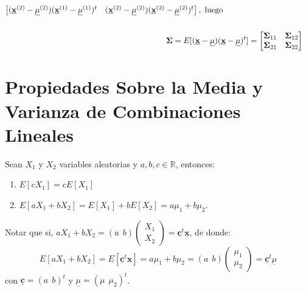 \documentclass[
]{book}
\theoremstyle{definition}
\theoremstyle{definition}
\theoremstyle{definition}
\theoremstyle{definition}
\theoremstyle{remark}
\begin{document}
\begin{align*}
\begin{bmatrix}
( \underline{\mathbf{x}}^{(2)}-\underline{\mu}^{(2)} )
( \underline{\mathbf{x}}^{(1)}-\underline{\mu}^{(1)} )^t &
  ( \underline{\mathbf{x}}^{(2)}-\underline{\mu}^{(2)} )
( \underline{\mathbf{x}}^{(2)}-\underline{\mu}^{(2)} )^t
\end{bmatrix}, \ \text{luego}
\\ \\
&\hspace{-2.5cm}
\mathbf{\Sigma} = E[(\underline{\mathbf{x}}-\underline{\mu})(\underline{\mathbf{x}}-\underline{\mu})^t]=\begin{bmatrix}
\mathbf{\Sigma}_{11} & \mathbf{\Sigma}_{12}\\
\mathbf{\Sigma}_{21} & \mathbf{\Sigma}_{22}
\end{bmatrix}
\end{align*}

\hypertarget{propiedades-sobre-la-media-y-varianza-de-combinaciones-lineales}{%
\section{Propiedades Sobre la Media y Varianza de Combinaciones Lineales}\label{propiedades-sobre-la-media-y-varianza-de-combinaciones-lineales}}

Sean \(X_1\) y \(X_2\) variables aleatorias y \(a,b,c \in \mathbb{R}\), entonces:

\begin{enumerate}
\def\labelenumi{\arabic{enumi}.}
\item
  \(E[cX_1]=cE[X_1]\)
\item
  \(E[aX_1+bX_2]=E[X_1]+bE[X_2]=a\mu_1+b\mu_2\).
\end{enumerate}

Notar que si, \(aX_1+bX_2=(a \ \ b)\begin{pmatrix} X_1 \\ X_2 \end{pmatrix}=\underline{\mathbf{c}}^t\underline{\mathbf{x}}\), de donde:
\[
E[aX_1+bX_2]=E[\underline{\mathbf{c}}^t\underline{\mathbf{x}}]=a\mu_1+b\mu_2=(a \ \ b)\begin{pmatrix}
\mu_1 \\ \mu_2
\end{pmatrix}=\underline{\mathbf{c}}^t \underline{\mu}
\]
con \(\underline{\mathbf{c}}=(a \ \ b)^t\) y \(\underline{\mu}=(\mu \ \  \mu_2)^t\).
\end{document}

